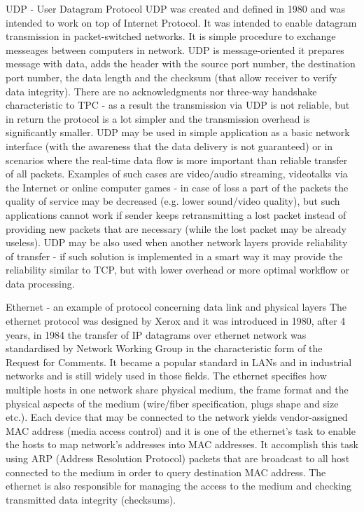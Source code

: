 \documentclass[magisterska,en]{pracamgr}
\begin{document}
UDP - User Datagram Protocol
UDP was created and defined in 1980 and was intended to work on top of Internet Protocol. It was intended to enable datagram transmission in packet-switched networks. It is simple procedure to exchange messeages between computers in network. UDP is message-oriented it prepares message with data, adds the header with the source port number, the destination port number, the data length and the checksum (that allow receiver to verify data integrity). There are no acknowledgments nor three-way handshake characteristic to TPC - as a result the transmission via UDP is not reliable, but in return the protocol is a lot simpler and the transmission overhead is significantly smaller. UDP may be used in simple application as a basic network interface (with the awareness that the data delivery is not guaranteed) or in scenarios where the real-time data flow is more important than reliable transfer of all packets. Examples of such cases are video/audio streaming, videotalks via the Internet or online computer games - in case of loss a part of the packets the quality of service may be decreased (e.g. lower sound/video quality), but such applications cannot work if sender keeps retransmitting a lost packet instead of providing new packets that are necessary (while the lost packet may be already useless). UDP may be also used when another network layers provide reliability of transfer - if such solution is implemented in a smart way it may provide the reliability similar to TCP, but with lower overhead or more optimal workflow or data processing. \cite{RFC_UDP}

Ethernet - an example of protocol concerning data link and physical layers
The ethernet protocol was designed by Xerox and it was introduced in 1980, after 4 years, in 1984 the transfer of IP datagrams over ethernet network was standardised by Network Working Group in the characteristic form of the Request for Comments. \cite{RFC_ETH} It became a popular standard in LANs and in industrial networks and is still widely used in those fields. The ethernet specifies how multiple hosts in one network share physical medium, the frame format and the physical aspects of the medium (wire/fiber specification, plugs shape and size etc.). Each device that may be connected to the network yields vendor-assigned MAC address (media access control) and it is one of the ethernet's task to enable the hosts to map network's addresses into MAC addresses. It accomplish this task using ARP (Address Resolution Protocol) packets that are broadcast to all host connected to the medium in order to query destination MAC address. The ethernet is also responsible for managing the access to the medium and checking transmitted data integrity (checksums).
\end{document}
